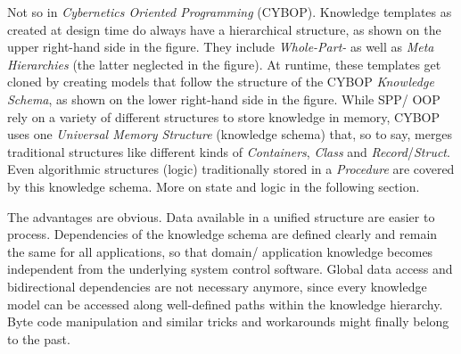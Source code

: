Not so in \emph{Cybernetics Oriented Programming} (CYBOP). Knowledge templates
as created at design time do always have a hierarchical structure, as shown on
the upper right-hand side in the figure. They include \emph{Whole-Part-} as
well as \emph{Meta Hierarchies} (the latter neglected in the figure). At
runtime, these templates get cloned by creating models that follow the
structure of the CYBOP \emph{Knowledge Schema}, as shown on the lower
right-hand side in the figure. While SPP/ OOP rely on a variety of different
structures to store knowledge in memory, CYBOP uses one
\emph{Universal Memory Structure} (knowledge schema) that, so to say, merges
traditional structures like different kinds of \emph{Containers}, \emph{Class}
and \emph{Record}/\emph{Struct}. Even algorithmic structures (logic)
traditionally stored in a \emph{Procedure} are covered by this knowledge
schema. More on state and logic in the following section.

The advantages are obvious. Data available in a unified structure are easier to
process. Dependencies of the knowledge schema are defined clearly and remain
the same for all applications, so that domain/ application knowledge becomes
independent from the underlying system control software. Global data access and
bidirectional dependencies are not necessary anymore, since every knowledge
model can be accessed along well-defined paths within the knowledge hierarchy.
Byte code manipulation and similar tricks and workarounds might finally belong
to the past.
